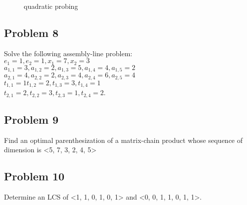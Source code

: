 \documentclass[a4paper]{article}
\makeatletter
\newenvironment{solution}
  {\begin{proof}[Solution]}
  {\end{proof}}
\renewenvironment{proof}[1][\proofname]{%
  \par\pushQED{\qed}\normalfont%
  \topsep6\p@\@plus6\p@\relax
  \trivlist\item[\hskip\labelsep\bfseries#1\@addpunct{.}]%
  \ignorespaces
}{%
  \popQED\endtrivlist\@endpefalse
}
\makeatother
\begin{document}
\qquad
\begin{minipage}{5cm}
\begin{figure}[H]
\centering
\caption{quadratic probing}
\end{figure}
\end{minipage}



\subsection*{Problem 8}
Solve the following assembly-line problem: \\ $e_1=1, e_2=1, x_1=7,x_2=3$ \\ $a_{1,1}=3, a_{1,2}=2,a_{1,3}=5, a_{1,4}=4, a_{1,5}=2$ \\ $a_{2,1}=4, a_{2,2}=2, a_{2,3}=4, a_{2,4}=6, a_{2,5}=4$ \\ $t_{1,1}=1 t_{1,2}=2, t_{1,3}=3, t_{1,4}=1$ \\ $t_{2,1}=2, t_{2,2}=3, t_{2,3}=1, t_{2,4}=2$.
\begin{solution}
\end{solution}

\subsection*{Problem 9}
Find an optimal parenthesization of a matrix-chain product whose sequence of dimension is <5, 7, 3, 2, 4, 5>
\begin{solution}
\end{solution}

\subsection*{Problem 10}
Determine an LCS of <1, 1, 0, 1, 0, 1> and <0, 0, 1, 1, 0, 1, 1>.
\begin{solution}
\end{solution}
\end{document}
